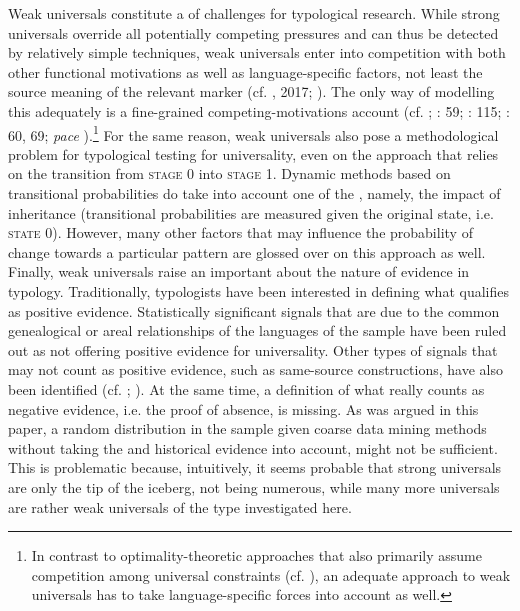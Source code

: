 \documentclass[output=paper]{langsci/langscibook}
\begin{document}
Weak universals constitute a  of challenges for typological research. While strong universals override all potentially competing pressures and can thus be detected by relatively simple techniques, weak universals enter into competition with both other functional motivations as well as language-specific factors, not least the source meaning of the relevant marker (cf. \citealt{Cristofaro2012}, 2017; \citealt{Hammarström2015}). The only way of modelling this adequately is a fine-grained competing-motivations account (cf. \citealt{Haiman1983}; \citealt{DuBois1985,Croft2003}: 59; \citealt{Bickel2014}: 115; \citealt{Hawkins2014_CompMot}: 60, 69; \textit{pace} ).\footnote{In contrast to optimality-theoretic approaches that also primarily assume competition among universal constraints (cf. \citealt{Aissen2003}), an adequate approach to weak universals has to take language-specific forces into account as well.} For the same reason, weak universals also pose a methodological problem for typological testing for universality, even on the  approach that relies on the transition from \textsc{stage} 0 into \textsc{stage} 1. Dynamic methods based on transitional probabilities do take into account one of the , namely, the impact of inheritance (transitional probabilities are measured given the original state, i.e. \textsc{state 0}). However, many other factors that may influence the probability of change towards a particular pattern are glossed over on this approach as well. Finally, weak universals raise an important  about the nature of evidence in typology. Traditionally, typologists have been interested in defining what qualifies as positive evidence. Statistically significant signals that are due to the common genealogical or areal relationships of the languages of the sample have been ruled out as not offering positive evidence for universality. Other types of signals that may not count as positive evidence, such as same-source constructions, have also been identified (cf. \citealt{Cristofaro2017}; ). At the same time, a definition of what really counts as negative evidence, i.e. the proof of absence, is missing. As was argued in this paper, a random distribution in the sample given coarse data mining methods without taking the  and historical evidence into account, might not be sufficient. This is problematic because, intuitively, it seems probable that strong universals are only the tip of the iceberg, not being numerous, while many more universals are rather weak universals of the type investigated here. 
\end{document}
